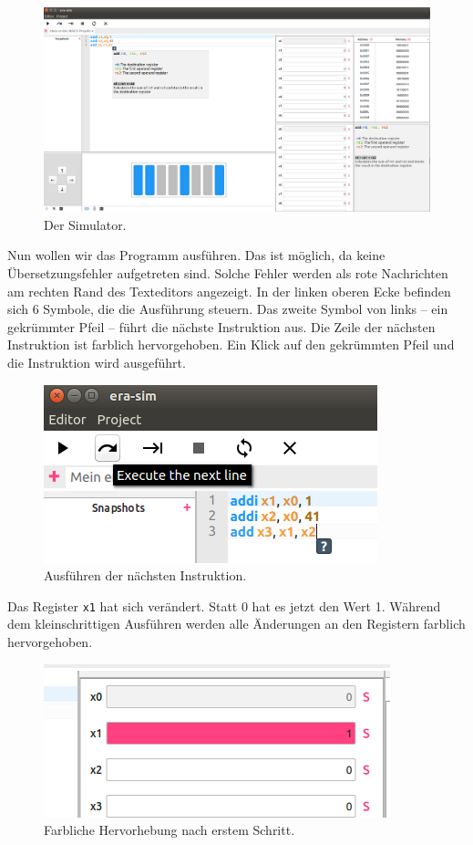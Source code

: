 \begin{figure}[H]
	\centering
	\includegraphics[scale=0.35]{Images/first-steps-2.png}
	\caption{Der Simulator.}
\end{figure}

Nun wollen wir das Programm ausführen. Das ist möglich, da keine
Übersetzungsfehler aufgetreten sind. Solche Fehler werden als rote Nachrichten
am rechten Rand des Texteditors angezeigt. In der linken oberen Ecke befinden
sich 6 Symbole, die die Ausführung steuern. Das zweite Symbol von links -- ein
gekrümmter Pfeil -- führt die nächste Instruktion aus. Die Zeile der nächsten
Instruktion ist farblich hervorgehoben. Ein Klick auf den gekrümmten Pfeil und
die Instruktion wird ausgeführt.

\begin{figure}[H]
	\centering
	\includegraphics[scale=1.0]{Images/first-steps-3.png}
	\caption{Ausführen der nächsten Instruktion.}
\end{figure}

Das Register \texttt{x1} hat sich verändert. Statt 0 hat es jetzt den Wert 1.
Während dem kleinschrittigen Ausführen werden alle Änderungen an den Registern
farblich hervorgehoben.

\begin{figure}[H]
	\centering
	\includegraphics[scale=1.0]{Images/first-steps-4.png}
	\caption{Farbliche Hervorhebung nach erstem Schritt.}
\end{figure}

